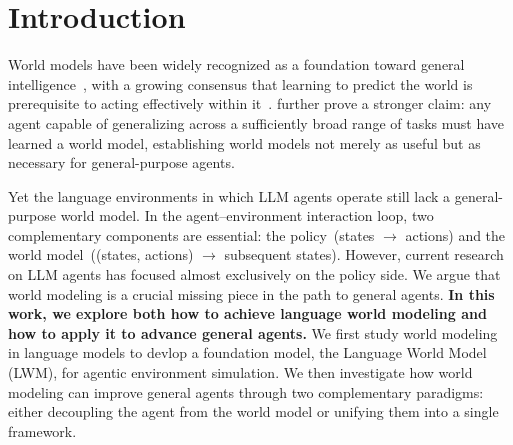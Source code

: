 \documentclass{llmxive}
\makeatletter
\providecommand{\addcontentsline}[3]{%
  \addtocontents{#1}{\protect\contentsline{#2}{#3}{\thepage}{\@currentHref}}}
\makeatother
\begin{document}
\vfill



\makeatletter
\def\addcontentsline#1#2#3{%
  \addtocontents{#1}{\protect\contentsline{#2}{#3}{\thepage}{\@currentHref}}}
\makeatother
\setcounter{tocdepth}{3}
\setcounter{secnumdepth}{3}
\tableofcontents



\section{Introduction}
\label{sec:intro}

World models have been widely recognized as a foundation toward general intelligence~\citep{genie3, worldlabs2025marble, xiang2025pan, ali2025world}, with a growing consensus that learning to predict the world is prerequisite to acting effectively within it~\citep{lecun2022path, hafner2023mastering, hafner2025training, assran2025v}.
\citet{richens2025general} further prove a stronger claim: any agent capable of generalizing across a sufficiently broad range of tasks must have learned a world model, establishing world models not merely as useful but as necessary for general-purpose agents.

 Yet the language environments in which LLM agents operate still lack a general-purpose world model.
In the agent–environment interaction loop, two complementary components are essential: the policy~(states $\rightarrow$ actions) and the world model~((states, actions) $\rightarrow$ subsequent states).
However, current research on LLM agents has focused almost exclusively on the policy side.
We argue that world modeling is a crucial missing piece in the path to general agents.
\textbf{In this work, we explore both how to achieve language world modeling and how to apply it to advance general agents.}
We first study world modeling in language models to devlop a foundation model, the Language World Model (LWM), for agentic environment simulation.
We then investigate how world modeling can improve general agents through two complementary paradigms: either decoupling the agent from the world model or unifying them into a single framework.
\end{document}
